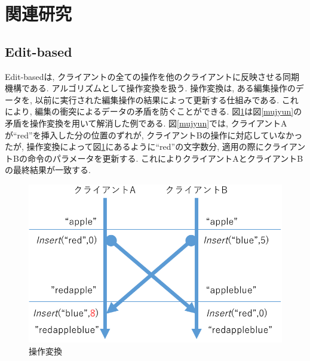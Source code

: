 \section{関連研究}
%
\subsection{Edit-based}
Edit-basedは, クライアントの全ての操作を他のクライアントに反映させる同期機構である.
アルゴリズムとして操作変換\cite{OT}を扱う.
操作変換は, ある編集操作のデータを, 以前に実行された編集操作の結果によって更新する仕組みである.
これにより, 編集の衝突によるデータの矛盾を防ぐことができる.
図\ref{ot}は図\ref{mujyun}の矛盾を操作変換を用いて解消した例である. 図\ref{mujyun}では, クライアントAが``red''を挿入した分の位置のずれが, クライアントBの操作に対応していなかったが, 操作変換によって図\ref{ot}にあるように``red''の文字数分, 適用の際にクライアントBの命令のパラメータを更新する. これによりクライアントAとクライアントBの最終結果が一致する.
\begin{figure}[htbp]
  \begin{center}
    \includegraphics[scale=0.5]{images/ot}
    \caption{操作変換}
    \label{ot}
  \end{center}
\end{figure}
%
